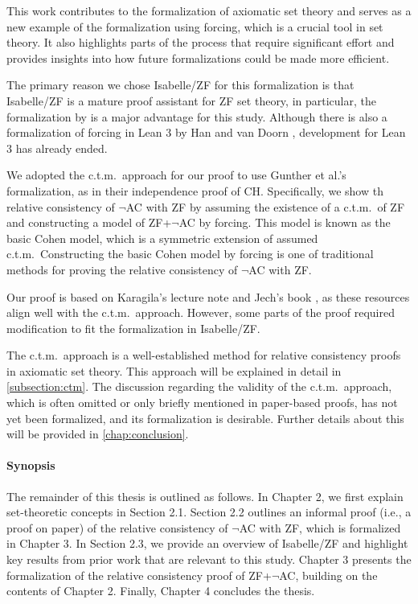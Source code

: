 \documentclass{report}
\begin{document}
This work contributes to the formalization of axiomatic set theory 
and serves as a new example of the formalization using forcing, which is a crucial tool in set theory.
It also highlights parts of the process that require significant effort 
and provides insights into how future formalizations could be made more efficient.

The primary reason we chose Isabelle/ZF for this formalization is that Isabelle/ZF is a mature proof assistant for ZF set theory,
in particular, the formalization by \cite{gunther_forcing} is a major advantage for this study.
Although there is also a formalization of forcing in Lean 3 by Han and van Doorn \cite{flypitch}, development for Lean 3 has already ended.

We adopted the c.t.m.\  approach for our proof to use Gunther et al.'s formalization, as in their independence proof of CH.
Specifically, we show th relative consistency of $\neg$AC with ZF 
by assuming the existence of a c.t.m.\  of ZF and constructing a model of ZF+$\neg$AC by forcing.
This model is known as the basic Cohen model, which is a symmetric extension of assumed c.t.m.\ 
Constructing the basic Cohen model by forcing is 
one of traditional methods for proving the relative consistency of $\neg$AC with ZF.

Our proof is based on Karagila's lecture note \cite{karagila} and Jech's book \cite{jech_AC},
as these resources align well with the c.t.m.\  approach.
However, some parts of the proof required modification to fit the formalization in Isabelle/ZF.

The c.t.m.\ approach is a well-established method for relative consistency proofs in axiomatic set theory.
This approach will be explained in detail in \cref{subsection:ctm}.
The discussion regarding the validity of the c.t.m.\ approach, 
which is often omitted or only briefly mentioned in paper-based proofs, has not yet been formalized, and its formalization is desirable.
Further details about this will be provided in \cref{chap:conclusion}.


\paragraph{Synopsis}
The remainder of this thesis is outlined as follows.
In Chapter 2, we first explain set-theoretic concepts in Section 2.1.
Section 2.2 outlines an informal proof (i.e., a proof on paper) of the relative consistency of $\neg$AC with ZF, which is formalized in Chapter 3.
In Section 2.3, we provide an overview of Isabelle/ZF and highlight key results from prior work that are relevant to this study.
Chapter 3 presents the formalization of the relative consistency proof of ZF+$\neg$AC, building on the contents of Chapter 2.
Finally, Chapter 4 concludes the thesis.
\end{document}
